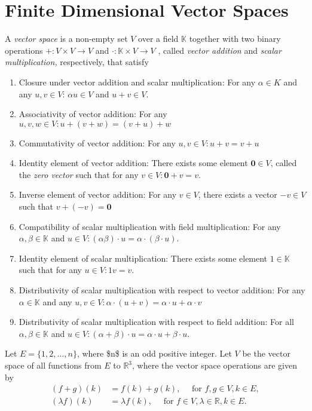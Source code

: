 
\chapter{\label{chap:finiteVectorSpace}Finite Dimensional Vector Spaces}
\begin{defn}
\label{def:vectorSpace}A \emph{vector space }is a non-empty set \emph{$V$
}over a field $\mathbb{K}$ together with two binary operations $+:V\times V\to V$
and $\cdot:\mathbb{K}\times V\to V$ , called \emph{vector addition
}and \emph{scalar multiplication, }respectively, that satisfy
\end{defn}

\begin{enumerate}
\item Closure under vector addition and scalar multiplication: For any $\alpha\in K$
and any $u,v\in V$: $\alpha u\in V$ and $u+v\in V.$
\item Associativity of vector addition: For any $u,v,w\in V:u+\left(v+w\right)=\left(v+u\right)+w$
\item Commutativity of vector addition: For any $u,v\in V:u+v=v+u$
\item Identity element of vector addition: There exists some element $\mathbf{0}\in V$,
called the \emph{zero vector }such that for any $v\in V:\mathbf{0}+v=v.$
\item Inverse element of vector addition: For any $v\in V$, there exists
a vector $-v\in V$ such that $v+\left(-v\right)=\mathbf{0}$
\item Compatibility of scalar multiplication with field multiplication:
For any $\alpha,\beta\in\mathbb{K}$ and $u\in V:\left(\alpha\beta\right)\cdot u=\alpha\cdot\left(\beta\cdot u\right).$
\item Identity element of scalar multiplication: There exists some element
$1\in\mathbb{K}$ such that for any $u\in V:1v=v.$
\item Distributivity of scalar multiplication with respect to vector addition:
For any $\alpha\in\mathbb{K}$ and any $u,v\in V:\alpha\cdot\left(u+v\right)=\alpha\cdot u+\alpha\cdot v$
\item Distributivity of scalar multiplication with respect to field addition:
For all $\alpha,\beta\in\mathbb{K}$ and $u\in V:\left(\alpha+\beta\right)\cdot u=\alpha\cdot u+\beta\cdot u.$
\end{enumerate}
\begin{xca}
\label{exer:isi2013psb1}Let $E=\{1,2,\ldots,n\}$, where \$n\$ is
an odd positive integer. Let $V$ be the vector space of all functions
from $E$ to $\mathbb{R}^{3}$, where the vector space operations
are given by 
\[
\begin{aligned}(f+g)(k) & =f(k)+g(k),\quad\text{ for }f,g\in V,k\in E,\\
(\lambda f)(k) & =\lambda f(k),\quad\text{ for }f\in V,\lambda\in\mathbb{R},k\in E.
\end{aligned}
\]
\end{xca}

